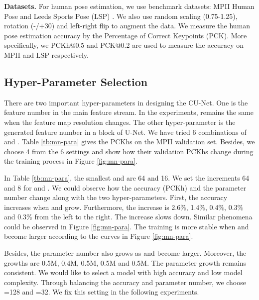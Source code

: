\documentclass{bmvc2k}
\begin{document}
{\bf Datasets.} For human pose estimation, we use benchmark datasets: MPII Human Pose \cite{andriluka14cvpr} and Leeds Sports Pose (LSP) \cite{johnson2010lsp}. We also use random scaling (0.75-1.25), rotation (-/+30) and left-right flip to augment the data. We measure the human pose estimation accuracy by the Percentage of Correct Keypoints (PCK). More specifically, we PCKh@0.5 and PCK@0.2 are used to measure the accuracy on MPII and LSP respectively.

\subsection{Hyper-Parameter Selection}
There are two important hyper-parameters in designing the CU-Net. One is the feature number  in the main feature stream. In the experiments,  remains the same when the feature map resolution changes. The other hyper-parameter is the generated feature number  in a block of U-Net. We have tried 6 combinations of  and . Table \ref{tb:mn-para} gives the PCKhs on the MPII validation set. Besides, we choose 4 from the 6 settings and show how their validation PCKhs change during the training process in Figure \ref{fig:mn-para}.

In Table \ref{tb:mn-para}, the smallest  and  are 64 and 16. We set the increments 64 and 8 for  and . We could observe how the accuracy (PCKh) and the parameter number change along with the two hyper-parameters. First, the accuracy increases when  and  grow. Furthermore, the increase is 2.6\%, 1.4\%, 0.4\%, 0.3\% and 0.3\% from the left to the right. The increase slows down. Similar phenomena could be observed in Figure \ref{fig:mn-para}. The training is more stable when  and  become larger according to the curves in Figure \ref{fig:mn-para}.

Besides, the parameter number also grows as  and  become larger. Moreover, the growths are 0.5M, 0.4M, 0.5M, 0.5M and 0.5M. The parameter growth remains consistent. We would like to select a model with high accuracy and low model complexity. Through balancing the accuracy and parameter number, we choose =128 and =32. We fix this setting in the following experiments.
\end{document}
